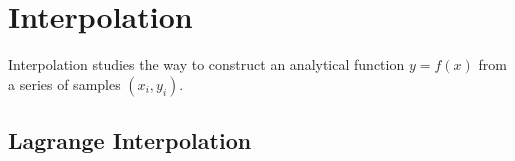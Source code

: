 \chapter{Interpolation}

Interpolation studies the way to construct an analytical function $y = f(x)$ from a series of samples $(x_i, y_i)$.

\section{Lagrange Interpolation}